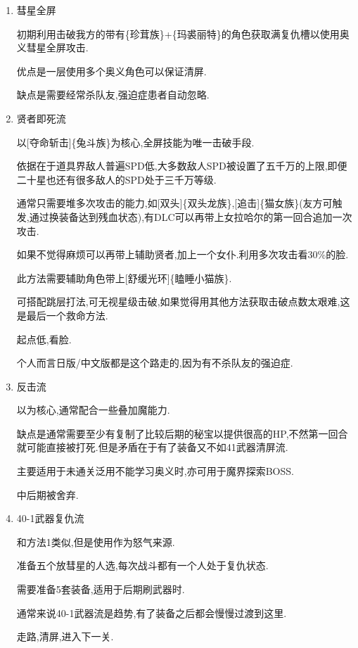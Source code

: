 	\begin{enumerate}

		\item
		彗星全屏

		初期利用击破我方的带有{\color{red}{自我牺牲}}\{珍茸族\}+{\color{red}{惊惧死灵}}\{玛裘丽特\}的角色获取满复仇槽以使用奥义彗星全屏攻击.

		优点是一层使用多个奥义角色可以保证清屏.
		
		缺点是需要经常杀队友,强迫症患者自动忽略.

		\item
		贤者即死流

		以[夺命斩击]\{兔斗族\}为核心,全屏技能为唯一击破手段.

		依据在于道具界敌人普遍SPD低,大多数敌人SPD被设置了五千万的上限,即便二十星也还有很多敌人的SPD处于三千万等级.

		通常只需要堆多次攻击的能力,如[双头]\{双头龙族\},[追击]\{猫女族\}(友方可触发,通过换装备达到残血状态),有DLC可以再带上女拉哈尔的第一回合追加一次攻击.

		如果不觉得麻烦可以再带上辅助贤者,加上一个女仆.利用多次攻击看30\%的脸.

		此方法需要辅助角色带上[舒缓光环]\{瞌睡小猫族\}.

		可搭配跳层打法,可无视星级击破,如果觉得用其他方法获取击破点数太艰难,这是最后一个救命方法.

		起点低,看脸.

		个人而言日版/中文版都是这个路走的,因为有不杀队友的强迫症.

		\item
		反击流

		以{\color{red}{强制反击+防御必定反击}}为核心,通常配合一些叠加魔能力.

		缺点是通常需要至少有复制了比较后期的秘宝以提供很高的HP,不然第一回合就可能直接被打死.但是矛盾在于有了装备又不如41武器清屏流.

		主要适用于未通关泛用不能学习奥义时,亦可用于魔界探索BOSS.

		中后期被舍弃.

		\item
		40-1武器复仇流

		和方法1类似,但是使用{\color{red}{40-1武器}}作为怒气来源.

		准备五个放彗星的人选,每次战斗都有一个人处于复仇状态.

		需要准备5套装备,适用于后期刷武器时.

		通常来说40-1武器流是趋势,有了装备之后都会慢慢过渡到这里.

		走路,清屏,进入下一关.


\end{enumerate}
